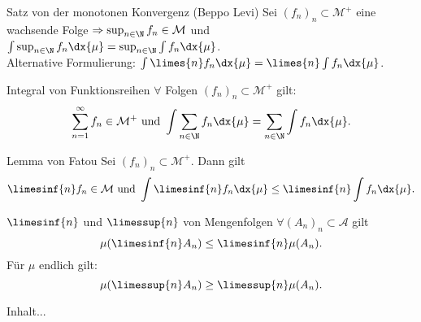 \begin{karte}{Satz von der monotonen Konvergenz (Beppo Levi)}
	Sei \( (f_n)_n \subset \mathcal{M}^+ \) eine wachsende Folge
	\( \Rightarrow \sup_{n\in\N} f_n \in \mathcal{M} \) und 
	\( \int \sup_{n\in\N} f_n \dx{\mu} 
	= \sup_{n\in\N} \int f_n \dx{\mu} \).\\
	Alternative Formulierung: 
	\( \int \limes{n} f_n \dx{\mu} 
	= \limes{n} \int f_n \dx{\mu} \).
\end{karte}

\begin{karte}{Integral von Funktionsreihen}
	\( \forall \) Folgen \( (f_n)_n \subset \mathcal{M}^+ \) gilt: 
	\[ \sum_{n=1}^{\infty} f_n \in \mathcal{M}^+ \text{ und } \int \sum_{n\in\N} f_n \dx{\mu} 
	= \sum_{n\in\N} \int f_n \dx{\mu}. \]
\end{karte}

\begin{karte}{Lemma von Fatou}
	Sei \( (f_n)_n \subset \mathcal{M}^+ \). Dann gilt 
	\[ \limesinf{n} f_n \in \mathcal{M} 
	\text{ und } \int \limesinf{n} f_n \dx{\mu} \leq \limesinf{n} \int f_n \dx{\mu}. \]
\end{karte}

\begin{karte}{\(\limesinf{n}\) und \( \limessup{n} \) von Mengenfolgen}
	\( \forall (A_n)_n \subset \mathcal{A} \) gilt 
	\[ \mu(\limesinf{n} A_n) \leq \limesinf{n} \mu(A_n). \]
	Für \( \mu \) endlich gilt: 
	\[ \mu(\limessup{n} A_n) \geq \limessup{n} \mu(A_n). \]
\end{karte}

\begin{karte}{}
	Inhalt...
\end{karte}